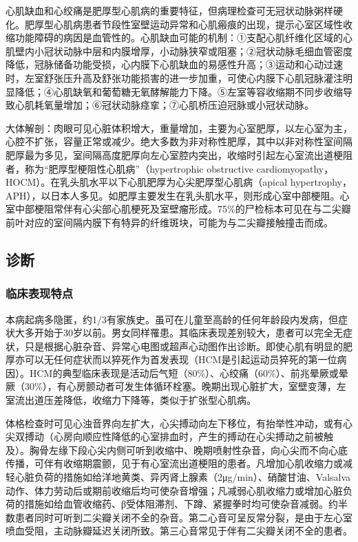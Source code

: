 心肌缺血和心绞痛是肥厚型心肌病的重要特征，但病理检查可无冠状动脉粥样硬化。肥厚型心肌病患者节段性室壁运动异常和心肌瘢痕的出现，提示心室区域性收缩功能障碍的病因是血管性的。心肌缺血可能的机制：①支配心肌纤维化区域的心肌壁内小冠状动脉中层和内膜增厚，小动脉狭窄或阻塞；②冠状动脉毛细血管密度降低，冠脉储备功能受损，心内膜下心肌缺血的易感性升高；③运动和心动过速时，左室舒张压升高及舒张功能损害的进一步加重，可使心内膜下心肌冠脉灌注明显降低；④心肌缺氧和葡萄糖无氧酵解能力下降。⑤左室等容收缩期不同步收缩导致心肌耗氧量增加；⑥冠状动脉痉挛；⑦心肌桥压迫冠脉或小冠状动脉。

大体解剖：肉眼可见心脏体积增大，重量增加，主要为心室肥厚，以左心室为主，心腔不扩张，容量正常或减少。绝大多数为非对称性肥厚，其中以非对称性室间隔肥厚最为多见，室间隔高度肥厚向左心室腔内突出，收缩时引起左心室流出道梗阻者，称为“肥厚型梗阻性心肌病”（hypertrophic
obstructive
cardiomyopathy，HOCM）。在乳头肌水平以下心肌肥厚为心尖肥厚型心肌病（apical
hypertrophy，APH），以日本人多见。如肥厚主要发生在乳头肌水平，则形成心室中部梗阻。心室中部梗阻常伴有心尖部心肌梗死及室壁瘤形成。75\%的尸检标本可见在与二尖瓣前叶对应的室间隔内膜下有特异的纤维斑块，可能为与二尖瓣接触撞击而成。

\subsection{诊断}

\subsubsection{临床表现特点}

本病起病多隐匿，约1/3有家族史。虽可在儿童至高龄的任何年龄段内发病，但症状大多开始于30岁以前。男女同样罹患。其临床表现差别较大，患者可以完全无症状，只是根据心脏杂音、异常心电图或超声心动图作出诊断。即使心肌有明显的肥厚亦可以无任何症状而以猝死作为首发表现（HCM是引起运动员猝死的第一位病因）。HCM的典型临床表现是活动后气短（80\%）、心绞痛（60\%）、前兆晕厥或晕厥（30\%），有心房颤动者可发生体循环栓塞。晚期出现心脏扩大，室壁变薄，左室流出道压差降低，收缩力下降等，类似于扩张型心肌病。

体格检查时可见心浊音界向左扩大，心尖搏动向左下移位，有抬举性冲动，或有心尖双搏动（心房向顺应性降低的心室排血时，产生的搏动在心尖搏动之前被触及）。胸骨左缘下段心尖内侧可听到收缩中、晚期喷射性杂音，向心尖而不向心底传播，可伴有收缩期震颤，见于有心室流出道梗阻的患者。凡增加心肌收缩力或减轻心脏负荷的措施如给洋地黄类、异丙肾上腺素（2μg/min）、硝酸甘油、Valsalva动作、体力劳动后或期前收缩后均可使杂音增强；凡减弱心肌收缩力或增加心脏负荷的措施如给血管收缩药、β受体阻滞剂、下蹲、紧握拳时均可使杂音减弱。约半数患者同时可听到二尖瓣关闭不全的杂音。第二心音可呈反常分裂，是由于左心室喷血受阻，主动脉瓣延迟关闭所致。第三心音常见于伴有二尖瓣关闭不全的患者。

